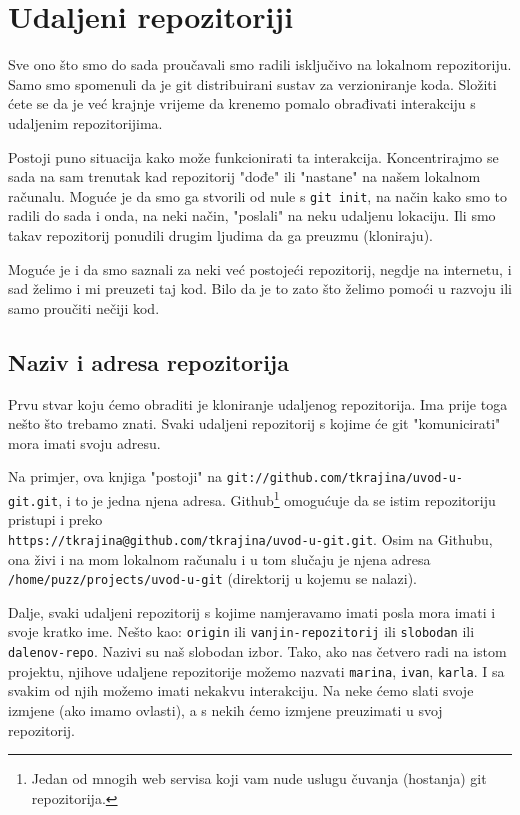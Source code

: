 \chapter*{Udaljeni repozitoriji}

Sve ono što smo do sada proučavali smo radili isključivo na lokalnom repozitoriju.
Samo smo spomenuli da je git distribuirani sustav za verzioniranje koda. 
Složiti ćete se da je već krajnje vrijeme da krenemo pomalo obrađivati interakciju s udaljenim repozitorijima.

Postoji puno situacija kako može funkcionirati ta interakcija.
Koncentrirajmo se sada na sam trenutak kad repozitorij "dođe" ili "nastane" na našem lokalnom računalu.
Moguće je da smo ga stvorili od nule s \verb+git init+, na način kako smo to radili do sada i onda, na neki način, "poslali" na neku udaljenu lokaciju.
Ili smo takav repozitorij ponudili drugim ljudima da ga preuzmu (kloniraju).

Moguće je i da smo saznali za neki već postojeći repozitorij, negdje na internetu, i sad želimo i mi preuzeti taj kod.
Bilo da je to zato što želimo pomoći u razvoju ili samo proučiti nečiji kod.

\section*{Naziv i adresa repozitorija}

Prvu stvar koju ćemo obraditi je kloniranje udaljenog repozitorija.
Ima prije toga nešto što trebamo znati.
Svaki udaljeni repozitorij s kojime će git "komunicirati" mora imati svoju adresu.

Na primjer, ova knjiga "postoji" na \verb+git://github.com/tkrajina/uvod-u-git.git+, i to je jedna njena adresa.
Github\footnote{Jedan od mnogih web servisa koji vam nude uslugu čuvanja (hostanja) git repozitorija.} omogućuje da se istim repozitoriju pristupi i preko \\ \verb+https://tkrajina@github.com/tkrajina/uvod-u-git.git+.
Osim na Githubu, ona živi i na mom lokalnom računalu i u tom slučaju je njena adresa \\\verb+/home/puzz/projects/uvod-u-git+ (direktorij u kojemu se nalazi).

Dalje, svaki udaljeni repozitorij s kojime namjeravamo imati posla mora imati i svoje kratko ime.
Nešto kao: \verb+origin+ ili \verb+vanjin-repozitorij+ ili \verb+slobodan+ ili \verb+dalenov-repo+.
Nazivi su naš slobodan izbor. 
Tako, ako nas četvero radi na istom projektu, njihove udaljene repozitorije možemo nazvati \verb+marina+, \verb+ivan+, \verb+karla+.
I sa svakim od njih možemo imati nekakvu interakciju. 
Na neke ćemo slati svoje izmjene (ako imamo ovlasti), a s nekih ćemo izmjene preuzimati u svoj repozitorij.

